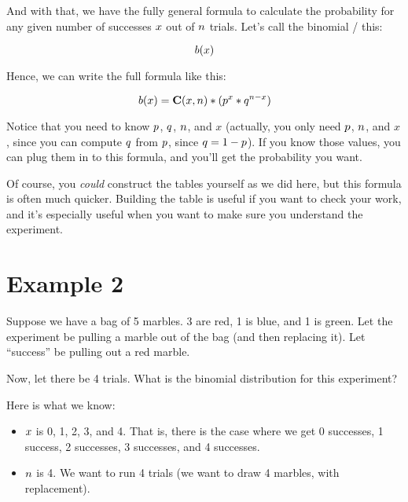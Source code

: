 \documentclass[../../../main.tex]{subfiles}
\begin{document}
\noindent
And with that, we have the fully general formula to calculate the probability for any given number of successes $\RandVarVal/$ out of $\numTrials/$ trials. Let's call the binomial \PDFtext/ this: 

\begin{equation*}
    \Binom{\RandVarVal/}
\end{equation*}

Hence, we can write the full formula like this:

\begin{equation*}
    \Binom{\RandVarVal/} = \combs{\RandVarVal/}{n} * (p^{\RandVarVal/} * q^{n - \RandVarVal/})
\end{equation*}

Notice that you need to know $\success/$, $\failure/$, $\numTrials/$, and $x$ (actually, you only need $\success/$, $\numTrials/$, and $x$, since you can compute $\failure/$ from $\success/$, since $\failure/ = 1 - \success/$). If you know those values, you can plug them in to this formula, and you'll get the probability you want. 

Of course, you \emph{could} construct the tables yourself as we did here, but this formula is often much quicker. Building the table is useful if you want to check your work, and it's especially useful when you want to make sure you understand the experiment.


\section{Example 2}

Suppose we have a bag of 5 marbles. 3 are red, 1 is blue, and 1 is green. Let the experiment be pulling a marble out of the bag (and then replacing it). Let ``success'' be pulling out a red marble. 

Now, let there be 4 trials. What is the binomial distribution for this experiment?

Here is what we know:

\begin{itemize}
  \item $\RandVarVal/$ is 0, 1, 2, 3, and 4. That is, there is the case where we get 0 successes, 1 success, 2 successes, 3 successes, and 4 successes.
  \item $\numTrials/$ is 4. We want to run 4 trials (we want to draw 4 marbles, with replacement).
\end{itemize}
\end{document}
